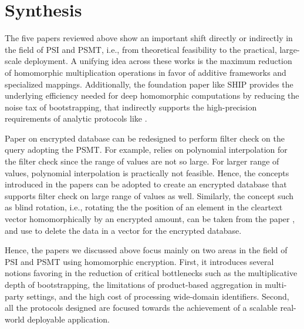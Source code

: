 \documentclass[12pt]{article}
\begin{document}
\section{Synthesis}
The five papers reviewed above show an important shift directly or indirectly in the field of PSI and PSMT, i.e., from theoretical feasibility to the practical, large-scale deployment. A unifying idea across these works is the maximum reduction of homomorphic multiplication operations in favor of additive frameworks and specialized mappings. Additionally, the foundation paper like SHIP \cite{cheon2025ship} provides the underlying efficiency needed for deep homomorphic computations by reducing the noise tax of bootstrapping, that indirectly supports the high-precision requirements of analytic protocols like \cite{koirala2025select}.

Paper \cite{blindenbach2024squid} on encrypted database can be redesigned to perform filter check on the query adopting the PSMT. For example, \cite{blindenbach2024squid} relies on polynomial interpolation for the filter check since the range of values are not so large. For larger range of values, polynomial interpolation is practically not feasible. Hence, the concepts introduced in the papers \cite{koirala2025psmt,koirala2025select,paik2025scalable} can be adopted to create an encrypted database that supports filter check on large range of values as well. Similarly, the concept such as blind rotation, i.e., rotating the the position of an element in the cleartext vector homomorphically by an encrypted amount, can be taken from the paper \cite{cheon2025ship}, and use to delete the data in a vector for the encrypted database. 

Hence, the papers we discussed above focus mainly on two areas in the field of PSI and PSMT using homomorphic encryption. First, it introduces several notions favoring in the reduction of critical bottlenecks such as the multiplicative depth of bootstrapping, the limitations of product-based aggregation in multi-party settings, and the high cost of processing wide-domain identifiers. Second, all the protocols designed are focused towards the achievement of a scalable real-world deployable application.



\end{document}
